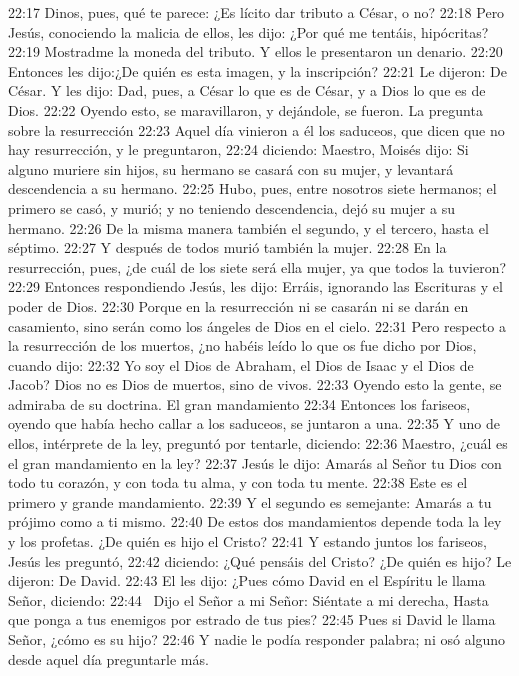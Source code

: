 22:17 Dinos, pues, qué te parece: ¿Es lícito dar tributo a César, o no? 
22:18 Pero Jesús, conociendo la malicia de ellos, les dijo: ¿Por qué me tentáis, hipócritas? 
22:19 Mostradme la moneda del tributo. Y ellos le presentaron un denario. 
22:20 Entonces les dijo:¿De quién es esta imagen, y la inscripción? 
22:21 Le dijeron: De César. Y les dijo: Dad, pues, a César lo que es de César, y a Dios lo que es de Dios. 
22:22 Oyendo esto, se maravillaron, y dejándole, se fueron. 
La pregunta sobre la resurrección  
22:23 Aquel día vinieron a él los saduceos, que dicen que no hay resurrección, y le preguntaron, 
22:24 diciendo: Maestro, Moisés dijo: Si alguno muriere sin hijos, su hermano se casará con su mujer, y levantará descendencia a su hermano. 
22:25 Hubo, pues, entre nosotros siete hermanos; el primero se casó, y murió; y no teniendo descendencia, dejó su mujer a su hermano. 
22:26 De la misma manera también el segundo, y el tercero, hasta el séptimo. 
22:27 Y después de todos murió también la mujer. 
22:28 En la resurrección, pues, ¿de cuál de los siete será ella mujer, ya que todos la tuvieron? 
22:29 Entonces respondiendo Jesús, les dijo: Erráis, ignorando las Escrituras y el poder de Dios. 
22:30 Porque en la resurrección ni se casarán ni se darán en casamiento, sino serán como los ángeles de Dios en el cielo. 
22:31 Pero respecto a la resurrección de los muertos, ¿no habéis leído lo que os fue dicho por Dios, cuando dijo: 
22:32 Yo soy el Dios de Abraham, el Dios de Isaac y el Dios de Jacob? Dios no es Dios de muertos, sino de vivos. 
22:33 Oyendo esto la gente, se admiraba de su doctrina. 
El gran mandamiento  
22:34 Entonces los fariseos, oyendo que había hecho callar a los saduceos, se juntaron a una. 
22:35 Y uno de ellos, intérprete de la ley, preguntó por tentarle, diciendo: 
22:36 Maestro, ¿cuál es el gran mandamiento en la ley? 
22:37 Jesús le dijo: Amarás al Señor tu Dios con todo tu corazón, y con toda tu alma, y con toda tu mente. 
22:38 Este es el primero y grande mandamiento. 
22:39 Y el segundo es semejante: Amarás a tu prójimo como a ti mismo. 
22:40 De estos dos mandamientos depende toda la ley y los profetas. 
¿De quién es hijo el Cristo?  
22:41 Y estando juntos los fariseos, Jesús les preguntó, 
22:42 diciendo: ¿Qué pensáis del Cristo? ¿De quién es hijo? Le dijeron: De David. 
22:43 El les dijo: ¿Pues cómo David en el Espíritu le llama Señor, diciendo: 
22:44  Dijo el Señor a mi Señor: 
Siéntate a mi derecha, 
Hasta que ponga a tus enemigos por estrado de tus pies? 
22:45 Pues si David le llama Señor, ¿cómo es su hijo? 
22:46 Y nadie le podía responder palabra; ni osó alguno desde aquel día preguntarle más. 
